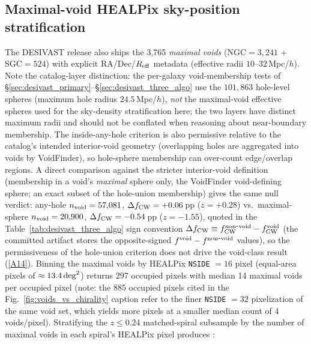 \documentclass[twocolumn,linenumbers]{aastex702}
\newcommand{\repoBase}{https://github.com/Hubify-Projects/bigbounce/blob/main}
\begin{document}
\subsection{Maximal-void HEALPix sky-position stratification}\label{sec:desivast_maximal_healpix}

The DESIVAST release also ships the 3,765 \emph{maximal voids}
(NGC$=3{,}241$ + SGC$=524$) with explicit RA/Dec/$R_{\rm eff}$ metadata
(effective radii $10$--$32\,$Mpc/$h$). Note the catalog-layer
distinction: the per-galaxy void-membership tests of
\S\ref{sec:desivast_primary}--\S\ref{sec:desivast_three_algo} use the
$101{,}863$ hole-level spheres (maximum hole radius
$24.5\,$Mpc/$h$), \emph{not} the maximal-void effective spheres used
for the sky-density stratification here; the two layers have distinct
maximum radii and should not be conflated when reasoning about
near-boundary membership. The inside-any-hole criterion is also
permissive relative to the catalog's intended interior-void geometry
(overlapping holes are aggregated into voids by VoidFinder), so
hole-sphere membership can over-count edge/overlap regions. A direct
comparison against the stricter interior-void definition (membership
in a void's \emph{maximal} sphere only, the VoidFinder void-defining
sphere; an exact subset of the hole-union membership) gives the same
null verdict: any-hole $n_{\rm void} = 57{,}081$,
$\Delta f_{\rm CW} = +0.06$\,pp ($z = +0.28$) vs.\ maximal-sphere
$n_{\rm void} = 20{,}900$, $\Delta f_{\rm CW} = -0.54$\,pp
($z = -1.55$), quoted in the
Table~\ref{tab:desivast_three_algo} sign convention
$\Delta f_{\rm CW} \equiv f_{\rm CW}^{\rm non\mbox{-}void} -
f_{\rm CW}^{\rm void}$ (the committed artifact stores the
opposite-signed $f^{\rm void} - f^{\rm non\mbox{-}void}$ values), so
the permissiveness of the hole-union criterion does
not drive the void-class result
(\href{\repoBase/pipelines/p5\_desi\_chirality/outputs/24\_r24conf\_pod\_session.json}{[A14]}). Binning the maximal voids by
HEALPix \texttt{NSIDE} $= 16$ pixel (equal-area pixels of
$\approx 13.4\,{\rm deg}^2$) returns 297 occupied pixels with
median 14 maximal voids per occupied pixel (note: the 885 occupied pixels cited in the Fig.~\ref{fig:voids_vs_chirality} caption refer to the finer \texttt{NSIDE} $= 32$ pixelization of the same void set, which yields more pixels at a smaller median count of 4 voids/pixel). Stratifying the $z \leq
0.24$ matched-spiral subsample by the number of maximal voids in each
spiral's HEALPix pixel produces :
\end{document}
